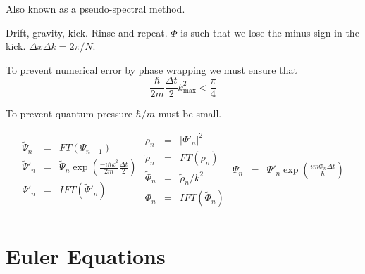 \documentclass{article}
\begin{document}
Also known as a pseudo-spectral method.

Drift, gravity, kick. Rinse and repeat. $\Phi$ is such that we lose the minus sign
in the kick. $\Delta x \Delta k = 2\pi / N$.

To prevent numerical error by phase wrapping we must ensure that 
\begin{equation}
\frac{\hbar}{2m}\frac{\Delta t}{2} k_\mathrm{max}^2  < \frac{\pi}{4}
\end{equation}

To prevent quantum pressure $\hbar / m$ must be small.

\begin{equation}
\begin{array}{rcl}
%
\tilde\Psi_n &=& FT(\Psi_{n-1}) \\
\tilde\Psi'_n &=& \tilde\Psi_n\exp(\frac{-i\hbar k^2}{2m}\frac{\Delta t}{2}) \\
\Psi'_n &=& IFT(\tilde\Psi'_n) \\
\end{array}
%
\begin{array}{rcl}
\rho_n &=& |\Psi'_n|^2 \\
\tilde\rho_n &=& FT(\rho_n) \\
\tilde\Phi_n &=& \tilde\rho_n / k^2 \\
\Phi_n &=& IFT( \tilde\Phi_n) \\
\end{array}
%
\begin{array}{rcl}
\Psi_n &=& \Psi'_n\exp(\frac{im\Phi_n\Delta t}{\hbar}) \\
\end{array}
%
\end{equation}


\section{Euler Equations}
\end{document}
